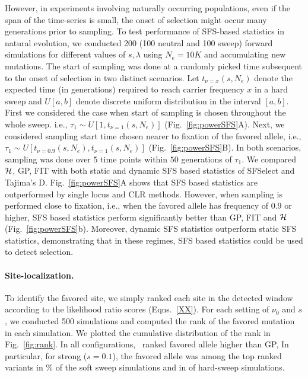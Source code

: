 However, in experiments involving naturally occurring populations,
even if the span of the time-series is small, the onset of selection
might occur many generations prior to sampling. To test performance of
SFS-based statistics in natural evolution, we conducted 200 (100
neutral and 100 sweep) forward simulations for different values of
$s,\lambda$ using $N_e=10K$ and accumulating new mutations. The start
of sampling was done at a randomly picked time subsequent to the onset
of selection in two distinct scenarios. Let $t_{\nu=x}(s,N_e)$ denote
the expected time (in generations) required to reach carrier frequency
$x$ in a hard sweep and $U[a,b]$ denote discrete uniform distribution
in the interval $[a,b]$. First we considered the case when start of
sampling is chosen throughout the whole sweep. i.e., $\tau_1 \sim
U\left[1,t_{\nu=1}(s,N_e)\right]$ (Fig.~\ref{fig:powerSFS}A). Next, we
considered sampling start time chosen nearer to fixation of the
favored allele, i.e., $\tau_1 \sim
U\left[t_{\nu=0.9}(s,N_e),t_{\nu=1}(s,N_e)\right]$
(Fig.~\ref{fig:powerSFS}B). In both scenarios, sampling was done over
$5$ time points within $50$ generations of $\tau_1$. We compared
${\cal H}$, GP, FIT with both static and dynamic SFS based statistics of
SFSelect and Tajima's D. Fig.~\ref{fig:powerSFS}A shows that SFS based
statistics are outperformed by single locus and CLR methods. However,
when sampling is performed close to fixation, i.e., when the favored
allele has frequency of 0.9 or higher, SFS based statistics perform
significantly better than GP, FIT and ${\cal H}$
(Fig.~\ref{fig:powerSFS}b). Moreover, dynamic SFS statistics
outperform static SFS statistics, demonstrating that in these regimes,
SFS based statistics could be used to detect selection.


\paragraph{Site-localization.}
To identify the favored site, we simply ranked each site in the
detected window according to the likelihood ratio scores
(Eqns.~\ref{XX}). For each setting of $\nu_0$ and $s$, we conducted
500 simulations and computed the rank of the favored mutation in each
simulation. We plotted the cumulative distribution of the rank in
Fig.~\ref{fig:rank}. In all configurations, \comale\ ranked favored
allele higher than GP, In particular, for strong ($s=0.1$), the
favored allele was among the top  ranked variants in
\% of the soft sweep simulations and in  of
hard-sweep simulations.

